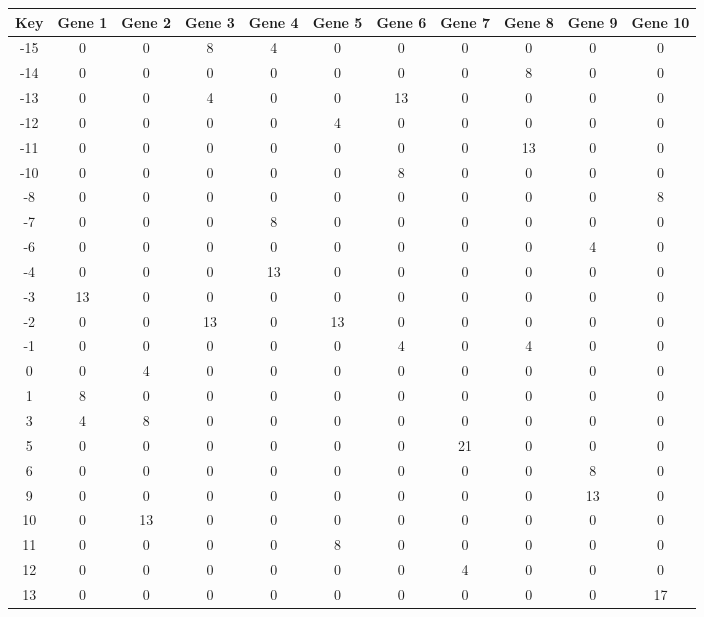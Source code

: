 \begin{tabular}{|c|c|c|c|c|c|c|c|c|c|c|}
\hline
Key & Gene 1 & Gene 2 & Gene 3 & Gene 4 & Gene 5 & Gene 6 & Gene 7 & Gene 8 & Gene 9 & Gene 10 \\
\hline
-15 & 0 & 0 & 8 & 4 & 0 & 0 & 0 & 0 & 0 & 0 \\
-14 & 0 & 0 & 0 & 0 & 0 & 0 & 0 & 8 & 0 & 0 \\
-13 & 0 & 0 & 4 & 0 & 0 & 13 & 0 & 0 & 0 & 0 \\
-12 & 0 & 0 & 0 & 0 & 4 & 0 & 0 & 0 & 0 & 0 \\
-11 & 0 & 0 & 0 & 0 & 0 & 0 & 0 & 13 & 0 & 0 \\
-10 & 0 & 0 & 0 & 0 & 0 & 8 & 0 & 0 & 0 & 0 \\
-8 & 0 & 0 & 0 & 0 & 0 & 0 & 0 & 0 & 0 & 8 \\
-7 & 0 & 0 & 0 & 8 & 0 & 0 & 0 & 0 & 0 & 0 \\
-6 & 0 & 0 & 0 & 0 & 0 & 0 & 0 & 0 & 4 & 0 \\
-4 & 0 & 0 & 0 & 13 & 0 & 0 & 0 & 0 & 0 & 0 \\
-3 & 13 & 0 & 0 & 0 & 0 & 0 & 0 & 0 & 0 & 0 \\
-2 & 0 & 0 & 13 & 0 & 13 & 0 & 0 & 0 & 0 & 0 \\
-1 & 0 & 0 & 0 & 0 & 0 & 4 & 0 & 4 & 0 & 0 \\
0 & 0 & 4 & 0 & 0 & 0 & 0 & 0 & 0 & 0 & 0 \\
1 & 8 & 0 & 0 & 0 & 0 & 0 & 0 & 0 & 0 & 0 \\
3 & 4 & 8 & 0 & 0 & 0 & 0 & 0 & 0 & 0 & 0 \\
5 & 0 & 0 & 0 & 0 & 0 & 0 & 21 & 0 & 0 & 0 \\
6 & 0 & 0 & 0 & 0 & 0 & 0 & 0 & 0 & 8 & 0 \\
9 & 0 & 0 & 0 & 0 & 0 & 0 & 0 & 0 & 13 & 0 \\
10 & 0 & 13 & 0 & 0 & 0 & 0 & 0 & 0 & 0 & 0 \\
11 & 0 & 0 & 0 & 0 & 8 & 0 & 0 & 0 & 0 & 0 \\
12 & 0 & 0 & 0 & 0 & 0 & 0 & 4 & 0 & 0 & 0 \\
13 & 0 & 0 & 0 & 0 & 0 & 0 & 0 & 0 & 0 & 17 \\
\hline
\end{tabular}